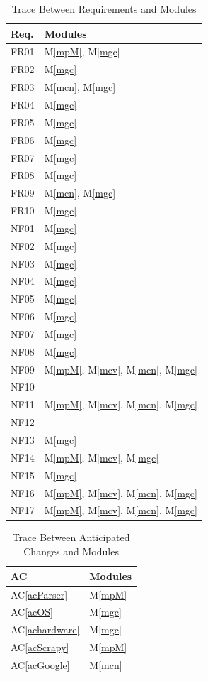 \documentclass[12pt, titlepage]{article}
\newcommand{\acref}[1]{AC\ref{#1}}
\newcommand{\mref}[1]{M\ref{#1}}
\begin{document}
\begin{table}[H]
\centering
\begin{tabular}{p{} p{}}
\toprule
\textbf{Req.} & \textbf{Modules}\\
\midrule
FR01 & \mref{mpM}, \mref{mgc} \\ %
FR02 & \mref{mgc}\\
FR03 & \mref{mcn}, \mref{mgc} \\
FR04 & \mref{mgc}\\
FR05 & \mref{mgc}\\
FR06 & \mref{mgc} \\
FR07 & \mref{mgc}\\
FR08 & \mref{mgc}\\
FR09 & \mref{mcn}, \mref{mgc}\\
FR10 & \mref{mgc}\\
NF01 & \mref{mgc}\\
NF02 & \mref{mgc}\\
NF03 & \mref{mgc}\\
NF04 & \mref{mgc}\\
NF05 & \mref{mgc}\\
NF06 & \mref{mgc} \\
NF07 & \mref{mgc}\\
NF08 & \mref{mgc} \\
NF09 & \mref{mpM}, \mref{mcv}, \mref{mcn}, \mref{mgc} \\
NF10 & \\
NF11 & \mref{mpM}, \mref{mcv}, \mref{mcn}, \mref{mgc} \\
NF12 & \\
NF13 & \mref{mgc}\\
NF14 & \mref{mpM}, \mref{mcv}, \mref{mgc} \\
NF15 & \mref{mgc}\\
NF16 & \mref{mpM}, \mref{mcv}, \mref{mcn}, \mref{mgc} \\
NF17 & \mref{mpM}, \mref{mcv}, \mref{mcn}, \mref{mgc} \\
\bottomrule
\end{tabular}
\caption{Trace Between Requirements and Modules}
\label{TblRT}
\end{table}

\begin{table}[H]
\centering
\begin{tabular}{p{} p{}}
\toprule
\textbf{AC} & \textbf{Modules}\\
\midrule
\acref{acParser} & \mref{mpM}\\
\acref{acOS} & \mref{mgc}\\
\acref{achardware} & \mref{mgc}\\
\acref{acScrapy} & \mref{mpM}\\
\acref{acGoogle} & \mref{mcn}\\
\bottomrule
\end{tabular}
\caption{Trace Between Anticipated Changes and Modules}
\label{TblACT}
\end{table}
\end{document}
